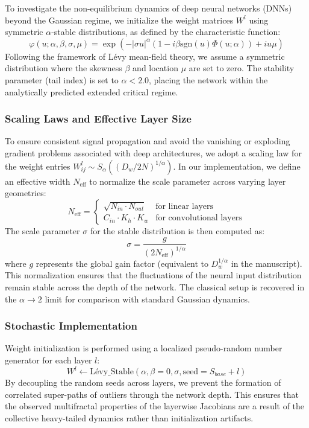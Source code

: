 \documentclass[11pt,a4paper]{article}
\begin{document}
To investigate the non-equilibrium dynamics of deep neural networks (DNNs) beyond the Gaussian regime, we initialize the weight matrices $W^l$ using symmetric $\alpha$-stable distributions, as defined by the characteristic function:
\begin{equation} \label{eq:levy_alpha}
    \varphi(u; \alpha, \beta, \sigma, \mu) = \exp\left(-|\sigma u|^\alpha (1 - i\beta \text{sgn}(u)\Phi(u; \alpha)) + iu\mu\right)
\end{equation}
Following the framework of Lévy mean-field theory, we assume a symmetric distribution where the skewness $\beta$ and location $\mu$ are set to zero. The stability parameter (tail index) is set to $\alpha < 2.0$, placing the network within the analytically predicted extended critical regime.

\subsubsection{Scaling Laws and Effective Layer Size}
To ensure consistent signal propagation and avoid the vanishing or exploding gradient problems associated with deep architectures, we adopt a scaling law for the weight entries $W_{ij}^l \sim S_\alpha((D_w / 2N)^{1/\alpha})$. In our implementation, we define an effective width $N_{\text{eff}}$ to normalize the scale parameter across varying layer geometries:
\begin{equation}
    N_{\text{eff}} = 
    \begin{cases} 
      \sqrt{N_{in} \cdot N_{out}} & \text{for linear layers} \\
      C_{in} \cdot K_h \cdot K_w & \text{for convolutional layers}
    \end{cases}
\end{equation}
The scale parameter $\sigma$ for the stable distribution is then computed as:
\begin{equation}
    \sigma = \frac{g}{(2 N_{\text{eff}})^{1/\alpha}}
\end{equation}
where $g$ represents the global gain factor (equivalent to $D_w^{1/\alpha}$ in the manuscript). This normalization ensures that the fluctuations of the neural input distribution remain stable across the depth of the network. The classical setup is recovered in the $\alpha \rightarrow 2$ limit for comparison with standard Gaussian dynamics.

\subsubsection{Stochastic Implementation}
Weight initialization is performed using a localized pseudo-random number generator for each layer $l$:
\begin{equation}
    W^l \leftarrow \text{Lévy\_Stable}(\alpha, \beta=0, \sigma, \text{seed} = S_{base} + l)
\end{equation}
By decoupling the random seeds across layers, we prevent the formation of correlated super-paths of outliers through the network depth. This ensures that the observed multifractal properties of the layerwise Jacobians are a result of the collective heavy-tailed dynamics rather than initialization artifacts.
\end{document}
